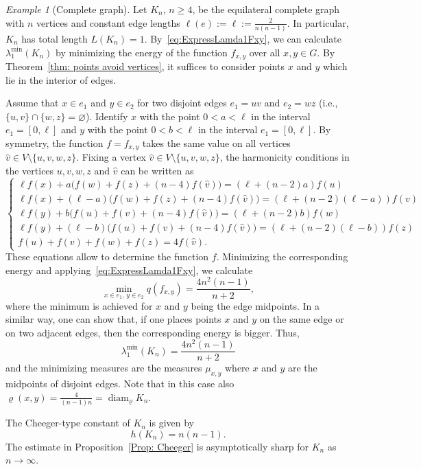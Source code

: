 \documentclass[reqno]{amsart}
\theoremstyle{plain}
\theoremstyle{definition}
\theoremstyle{remark}
\newtheorem{ex}[thm]{Example}
\numberwithin{equation}{section}
\newcommand{\diam}{\operatorname{diam}}
\begin{document}
\begin{ex}[Complete graph] \label{ex:CompleteGraph}
	Let $K_n$, $n \ge4 $, be the equilateral complete graph with $n$ vertices and constant edge lengths $\ell(e) := \ell := \frac{2}{n(n-1)}$. In particular, $K_n$ has total length $L(K_n) =1$. By~\eqref{eq:ExpressLamda1Fxy}, we can calculate $\lambda_1^{\min}(K_n)$ by minimizing the energy of the function $f_{x,y}$ over all $x,y \in G$. By Theorem~\ref{thm: points avoid vertices}, it suffices to consider points $x$ and $y$ which lie in the interior of edges.
	
	Assume that $x \in e_1$ and $y \in e_2$ for two disjoint edges $e_1=uv$ and $e_2=wz$ (i.e., $\{u,v\}\cap \{w,z\}  =\varnothing$). Identify $x$ with the point $0 < a < \ell$ in the interval $e_1 = [0, \ell]$ and $y$ with the point $0 < b < \ell$ in the interval $e_1 = [0, \ell]$. By symmetry, the function $f= f_{x,y}$ takes the same value on all vertices $\hat v \in  V\setminus  \{u,v,w,z\}$. Fixing a vertex $\hat v \in V\setminus  \{u,v,w,z\}$, the harmonicity conditions in the vertices $u,v,w,z$ and $\hat v$ can be written as 
	\[
	\begin{cases}
		\ell f(x) + a \big (f(w) +   f(z)  + (n-4)f(\hat v) \big ) = (\ell + (n-2)a )f(u)\\[2mm]	
		\ell f(x) + (\ell-a)\big ( f(w) + f(z) + (n-4) f(\hat v) \big )= (\ell + (n-2)(\ell -a) )f(v) \\[2mm]
		\ell f(y) + b \big (f(u) +   f(v)  + (n-4)f(\hat v) \big ) = (\ell + (n-2)b )f(w)\\[2mm]
		
		\ell f(y) + (\ell-b)\big ( f(u) + f(v) + (n-4) f(\hat v) \big )= (\ell + (n-2)(\ell -b) )f(z) \\[2mm]
		
		f(u) + f(v) + f(w) + f(z) = 4 f(\hat v).
	\end{cases}
	\]
	These equations allow to determine the function $f$. Minimizing the corresponding energy and applying~\eqref{eq:ExpressLamda1Fxy}, we calculate
	\[
	\min_{x \in e_1, \, y \in e_2} q(f_{x,y}) = \frac{4n^2\left(n-1\right)}{n+2},
	\]
	where the minimum is achieved for $x$ and $y$ being the edge midpoints. In a similar way, one can show that, if one places points $x$ and $y$ on the same edge or on two adjacent edges, then the corresponding energy is bigger. Thus,
	\[
	\lambda_{1}^{\min}(K_n)   = \frac{4n^2\left(n-1\right)}{n+2}
	\]
	and the minimizing measures are the measures $\mu_{x,y}$ where $x$ and $y$ are the midpoints of disjoint edges. Note that in this case also $\varrho(x,y) = \frac{4}{(n-1)n} = \diam_\varrho K_n$.
	
	The Cheeger-type constant of $K_n$ is given by
	\[
	h(K_n) = n(n-1).
	\]
	The estimate in Proposition~\ref{Prop: Cheeger} is asymptotically sharp for $K_n$ as $n \to \infty$.
\end{ex}
\end{document}
